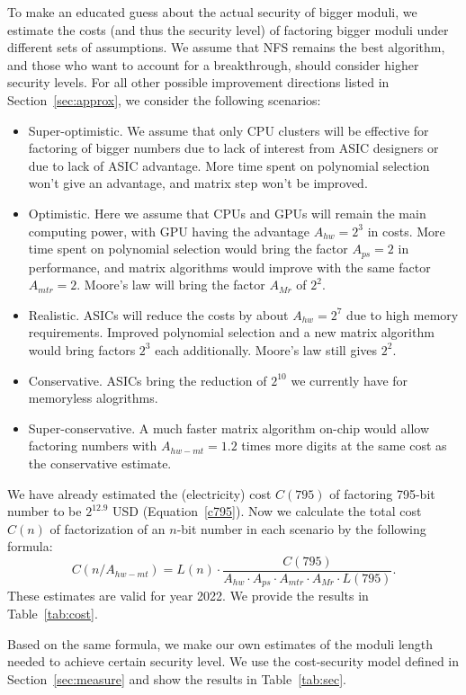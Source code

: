 \documentclass[a4paper]{article}
\begin{document}
 To make an educated guess about the actual security of bigger moduli, we estimate the costs (and thus the security level) of factoring bigger moduli under different sets of assumptions. We assume that NFS remains the best algorithm, and those who want to account for a breakthrough, should consider higher security levels. For all other possible improvement directions listed in Section~\ref{sec:approx}, we consider the following scenarios:
\begin{itemize}
    \item Super-optimistic. We assume that only CPU clusters will be effective for factoring of bigger numbers due to lack of interest from ASIC designers or due to lack of ASIC advantage. More time spent on polynomial selection won't give an advantage, and matrix step won't be improved.
    \item Optimistic. Here we assume that CPUs and GPUs will remain the main computing power, with GPU having the advantage $A_{hw}=2^3$ in costs. More time spent on polynomial selection would bring the factor $A_{ps}=2$ in performance, and matrix algorithms would improve with the same factor $A_{mtr}=2$. Moore's law will bring the factor $A_{Mr}$ of $2^2$.
    \item Realistic. ASICs will reduce the costs  by about $A_{hw}=2^{7}$ due to high memory requirements. Improved polynomial selection and a new matrix algorithm would bring factors $2^3$ each additionally. Moore's law still gives $2^2$.
     \item Conservative. ASICs bring the  reduction of $2^{10}$ we currently have for memoryless alogrithms.
     \item Super-conservative. A much faster matrix algorithm on-chip would allow factoring numbers with $A_{hw-mt}=1.2$ times more digits at the same cost as the conservative estimate.
 \end{itemize}

We have already estimated the (electricity) cost $C(795)$ of factoring 795-bit number to be $2^{12.9}$ USD (Equation~\eqref{c795}).
Now we calculate the total cost $C(n)$ of factorization of an $n$-bit number in each scenario by the following formula:
\begin{equation}
    C(n/A_{hw-mt}) =L(n) \cdot \frac{ C(795)}{ A_{hw}\cdot A_{ps} \cdot A_{mtr} \cdot A_{Mr} \cdot L(795)}.
\end{equation}
These estimates are valid for year 2022.
We provide the results in Table~\ref{tab:cost}.


 Based on the same formula, we make our own estimates of the moduli length needed to achieve certain security level. We use the cost-security model defined in Section~\ref{sec:measure} and show the results in Table~\ref{tab:sec}.
\end{document}
